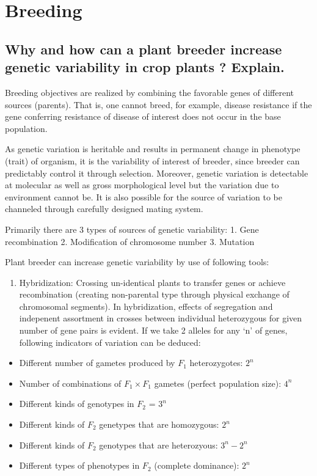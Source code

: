 \documentclass[
  openany]{book}
\providecommand{\tightlist}{%
  \setlength{\itemsep}{0pt}\setlength{\parskip}{0pt}}
\begin{document}
\hypertarget{breeding}{%
\chapter{Breeding}\label{breeding}}

\hypertarget{why-and-how-can-a-plant-breeder-increase-genetic-variability-in-crop-plants-explain.}{%
\section{Why and how can a plant breeder increase genetic variability in crop plants ? Explain.}\label{why-and-how-can-a-plant-breeder-increase-genetic-variability-in-crop-plants-explain.}}

Breeding objectives are realized by combining the favorable genes of different sources (parents). That is, one cannot breed, for example, disease resistance if the gene conferring resistance of disease of interest does not occur in the base population.

As genetic variation is heritable and results in permanent change in phenotype (trait) of organism, it is the variability of interest of breeder, since breeder can predictably control it through selection. Moreover, genetic variation is detectable at molecular as well as gross morphological level but the variation due to environment cannot be. It is also possible for the source of variation to be channeled through carefully designed mating system.

Primarily there are 3 types of sources of genetic variability:
1. Gene recombination
2. Modification of chromosome number
3. Mutation

Plant breeder can increase genetic variability by use of following tools:

\begin{enumerate}
\def\labelenumi{\arabic{enumi}.}
\tightlist
\item
  Hybridization: Crossing un-identical plants to transfer genes or achieve recombination (creating non-parental type through physical exchange of chromosomal segments). In hybridization, effects of segregation and indepenent assortment in crosses between individual heterozygous for given number of gene pairs is evident. If we take 2 alleles for any `n' of genes, following indicators of variation can be deduced:
\end{enumerate}

\begin{itemize}
\tightlist
\item
  Different number of gametes produced by \(F_1\) heterozygotes: \(2^n\)
\item
  Number of combinations of \(F_1 \times F_1\) gametes (perfect population size): \(4^n\)
\item
  Different kinds of genotypes in \(F_2\) = \(3^n\)
\item
  Different kinds of \(F_2\) genetypes that are homozygous: \(2^n\)
\item
  Different kinds of \(F_2\) genotypes that are heterozyous: \(3^n-2^n\)
\item
  Different types of phenotypes in \(F_2\) (complete dominance): \(2^n\)
\end{itemize}
\end{document}
